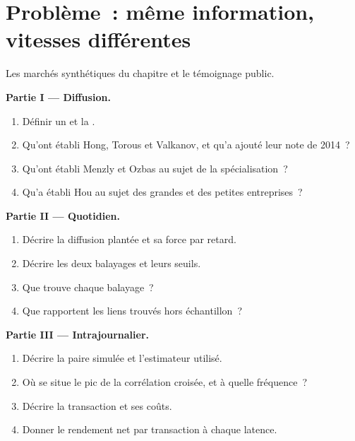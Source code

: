 \section{Problème~: même information, vitesses différentes}

\begin{problem}\label{pb:s1:cross-asset-lead-lag:1}
Les marchés synthétiques du chapitre et le témoignage public.

\medskip\noindent\textbf{Partie I --- Diffusion.}
\begin{enumerate}
\item Définir un  et la .
\item Qu'ont établi Hong, Torous et Valkanov, et qu'a ajouté leur note de 2014~?
\item Qu'ont établi Menzly et Ozbas au sujet de la spécialisation~?
\item Qu'a établi Hou au sujet des grandes et des petites entreprises~?
\end{enumerate}

\medskip\noindent\textbf{Partie II --- Quotidien.}
\begin{enumerate}[resume]
\item Décrire la diffusion plantée et sa force par retard.
\item Décrire les deux balayages et leurs seuils.
\item Que trouve chaque balayage~?
\item Que rapportent les liens trouvés hors échantillon~?
\end{enumerate}

\medskip\noindent\textbf{Partie III --- Intrajournalier.}
\begin{enumerate}[resume]
\item Décrire la paire simulée et l'estimateur utilisé.
\item Où se situe le pic de la corrélation croisée, et à quelle fréquence~?
\item Décrire la transaction et ses coûts.
\item Donner le rendement net par transaction à chaque latence.
\end{enumerate}


\end{problem}
